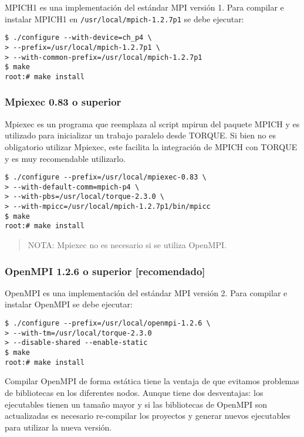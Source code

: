 \documentclass[a4paper,10pt,spanish]{article}
\begin{document}
MPICH1\cite{mpich1} es una implementaci\'{o}n del est\'{a}ndar MPI versi\'{o}n 1. Para compilar e instalar MPICH1 en \mbox{\texttt{/usr/local/mpich-1.2.7p1}} se debe ejecutar:

\begin{verbatim}
$ ./configure --with-device=ch_p4 \
> --prefix=/usr/local/mpich-1.2.7p1 \
> --with-common-prefix=/usr/local/mpich-1.2.7p1 
$ make 
root:# make install
\end{verbatim}

\subsubsection{Mpiexec 0.83 o superior}

Mpiexec\cite{mpiexec} es un programa que reemplaza al script mpirun del paquete MPICH y es utilizado para inicializar un trabajo paralelo desde TORQUE. Si bien no es obligatorio utilizar Mpiexec, este facilita la integraci\'{o}n de MPICH con TORQUE y es muy recomendable utilizarlo.

\begin{verbatim}
$ ./configure --prefix=/usr/local/mpiexec-0.83 \
> --with-default-comm=mpich-p4 \
> --with-pbs=/usr/local/torque-2.3.0 \
> --with-mpicc=/usr/local/mpich-1.2.7p1/bin/mpicc 
$ make 
root:# make install
\end{verbatim}

\begin{quote}
NOTA: Mpiexec no es necesario si se utiliza OpenMPI.
\end{quote}

\subsubsection{OpenMPI 1.2.6 o superior \small{[recomendado]}}

OpenMPI\cite{openmpi} es una implementaci\'{o}n del est\'{a}ndar MPI versi\'{o}n 2. Para compilar e instalar OpenMPI se debe ejecutar:

\begin{verbatim}
$ ./configure --prefix=/usr/local/openmpi-1.2.6 \
> --with-tm=/usr/local/torque-2.3.0
> --disable-shared --enable-static
$ make
root:# make install
\end{verbatim}

Compilar OpenMPI de forma est\'{a}tica tiene la ventaja de que evitamos problemas de bibliotecas en los diferentes nodos. Aunque tiene dos desventajas: los ejecutables tienen un tama\~{n}o mayor y si las bibliotecas de OpenMPI son actualizadas es necesario re-compilar los proyectos y generar nuevos ejecutables para utilizar la nueva versi\'{o}n.
\end{document}
